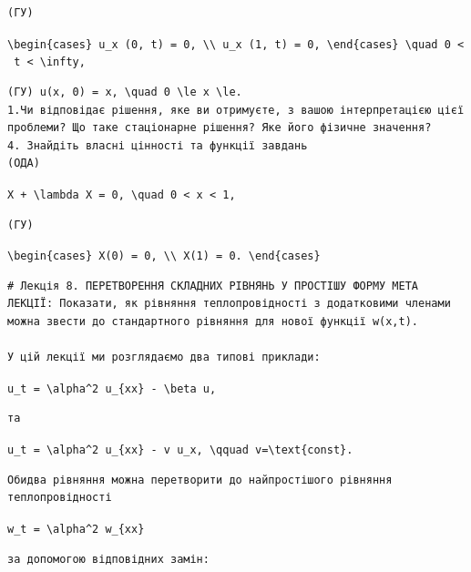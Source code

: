 \documentclass[
  ukrainian,
]{article}
\begin{document}
\begin{verbatim}
(ГУ)
\end{verbatim}

\texttt{\textbackslash{}begin\{cases\}\ u\_x\ (0,\ t)\ =\ 0,\ \textbackslash{}\textbackslash{}\ u\_x\ (1,\ t)\ =\ 0,\ \textbackslash{}end\{cases\}\ \textbackslash{}quad\ 0\ \textless{}\ t\ \textless{}\ \textbackslash{}infty,}

\begin{verbatim}
(ГУ) u(x, 0) = x, \quad 0 \le x \le. 
1.Чи відповідає рішення, яке ви отримуєте, з вашою інтерпретацією цієї проблеми? Що таке стаціонарне рішення? Яке його фізичне значення?
4. Знайдіть власні цінності та функції завдань
(ОДА)
\end{verbatim}

\texttt{X\textquotesingle{}\textquotesingle{}\ +\ \textbackslash{}lambda\ X\ =\ 0,\ \textbackslash{}quad\ 0\ \textless{}\ x\ \textless{}\ 1,}

\begin{verbatim}
(ГУ)
\end{verbatim}

\texttt{\textbackslash{}begin\{cases\}\ X\textquotesingle{}(0)\ =\ 0,\ \textbackslash{}\textbackslash{}\ X\textquotesingle{}(1)\ =\ 0.\ \textbackslash{}end\{cases\}}

\begin{verbatim}
# Лекція 8. ПЕРЕТВОРЕННЯ СКЛАДНИХ РІВНЯНЬ У ПРОСТІШУ ФОРМУ МЕТА ЛЕКЦІЇ: Показати, як рівняння теплопровідності з додатковими членами можна звести до стандартного рівняння для нової функції w(x,t).

У цій лекції ми розглядаємо два типові приклади:
\end{verbatim}

\texttt{u\_t\ =\ \textbackslash{}alpha\^{}2\ u\_\{xx\}\ -\ \textbackslash{}beta\ u,}

\begin{verbatim}
та
\end{verbatim}

\texttt{u\_t\ =\ \textbackslash{}alpha\^{}2\ u\_\{xx\}\ -\ v\ u\_x,\ \textbackslash{}qquad\ v=\textbackslash{}text\{const\}.}

\begin{verbatim}
Обидва рівняння можна перетворити до найпростішого рівняння теплопровідності
\end{verbatim}

\texttt{w\_t\ =\ \textbackslash{}alpha\^{}2\ w\_\{xx\}}

\begin{verbatim}
за допомогою відповідних замін:
\end{verbatim}
\end{document}
